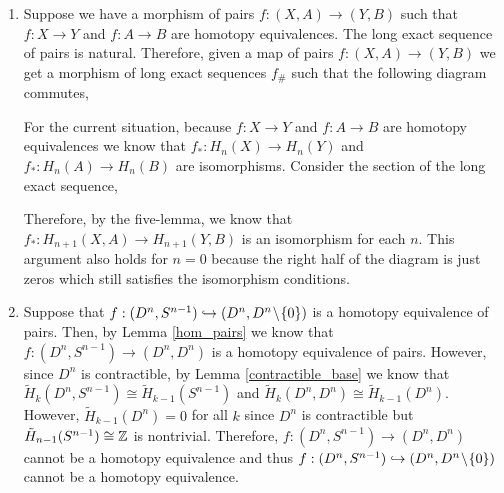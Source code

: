 \documentclass[12pt]{extarticle}
\begin{document}
\begin{enumerate}
\item
Suppose we have a morphism of pairs $f : (X, A) \to (Y, B)$ such that $f : X \to Y$ and $f : A \to B$ are homotopy equivalences. The long exact sequence of pairs is natural. Therefore, given a map of pairs $f : (X, A) \to (Y, B)$ we get a morphism of long exact sequences $f_{\#}$ such that the following diagram commutes,
\begin{center}
\end{center}
For the current situation, because $f : X \to Y$ and $f : A \to B$ are homotopy equivalences we know that $f_{*} : H_{n}(X) \to H_{n}(Y)$ and $f_{*} : H_{n}(A) \to H_{n}(B)$ are isomorphisms. Consider the section of the long exact sequence, 
\begin{center}
\end{center}
Therefore, by the five-lemma, we know that $f_{*} : H_{n+1}(X, A) \to H_{n+1}(Y, B)$ is an isomorphism for each $n$. This argument also holds for $n = 0$ because the right half of the diagram is just zeros which still satisfies the isomorphism conditions. 

\item
Suppose that $f : (D^n, S^{n-1}) \hookrightarrow (D^n, D^n \! \setminus \! \{ 0 \} )$ is a homotopy equivalence of pairs. Then, by Lemma \ref{hom_pairs} we  know that $f : (D^n, S^{n-1}) \to (D^n, D^n)$ is a homotopy equivalence of pairs. However, since $D^n$ is contractible, by Lemma \ref{contractible_base} we know that $\tilde{H}_k(D^n, S^{n-1}) \cong \tilde{H}_{k-1}(S^{n-1})$ and $\tilde{H}_k(D^n, D^n) \cong \tilde{H}_{k-1}(D^n)$. However, $\tilde{H}_{k-1}(D^n) = 0$ for all $k$ since $D^n$ is contractible but $\tilde{H}_{n-1}(S^{n-1}) \cong \mathbb{Z}$ is nontrivial. Therefore, $f : (D^n, S^{n-1}) \to (D^n, D^n)$ cannot be a homotopy equivalence and thus $f : (D^n, S^{n-1}) \hookrightarrow (D^n, D^n \! \setminus \! \{ 0 \} )$ cannot be a homotopy equivalence.
\end{enumerate}
\end{document}
